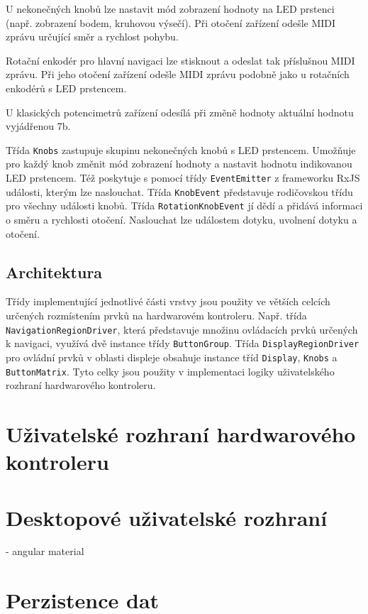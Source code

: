 \documentclass[thesis=M,czech]{FITthesis}[2019/03/06]
\begin{document}
	U nekonečných knobů lze nastavit mód zobrazení hodnoty na LED prstenci (např. zobrazení bodem, kruhovou výsečí).
	Při otočení zařízení odešle MIDI zprávu určující směr a rychlost pohybu.
	
	Rotační enkodér pro	hlavní navigaci lze stisknout a odeslat tak příslušnou MIDI zprávu. Při jeho otočení
	zařízení odešle MIDI zprávu podobně jako u rotačních enkodérů s LED prstencem.
	
	U klasických potencimetrů zařízení odesílá při změně hodnoty aktuální hodnotu vyjádřenou 7b.
	
	Třída \texttt{Knobs} zastupuje skupinu nekonečných knobů s LED prstencem. Umožňuje pro každý knob změnit mód zobrazení hodnoty a
	nastavit hodnotu indikovanou LED prstencem. Též poskytuje s pomocí třídy \texttt{EventEmitter} z frameworku RxJS události, kterým lze naslouchat.
	Třída \texttt{KnobEvent} představuje rodičovskou třídu pro všechny události knobů. Třída \texttt{RotationKnobEvent} jí dědí a přidává informaci
	o směru a rychlosti otočení. Naslouchat lze událostem dotyku, uvolnení dotyku a otočení.
	
	\subsection{Architektura}
	Třídy implementující jednotlivé části vrstvy jsou použity ve větších celcích určených rozmístením prvků na hardwarovém kontroleru.
	Např. třída \linebreak	\texttt{NavigationRegionDriver}, která představuje množinu ovládacích prvků určených k navigaci, využívá dvě instance třídy \texttt{ButtonGroup}.
	Třída \texttt{DisplayRegionDriver} pro ovládní prvků v oblasti displeje obsahuje instance tříd \texttt{Display}, \texttt{Knobs} a \texttt{ButtonMatrix}.
	Tyto celky jsou použity v implementaci logiky uživatelského rozhraní hardwarového kontroleru.
	
	\section{Uživatelské rozhraní hardwarového kontroleru}
	
	\section{Desktopové uživatelské rozhraní}
	- angular material
	
	\section{Perzistence dat}
	
\end{document}
